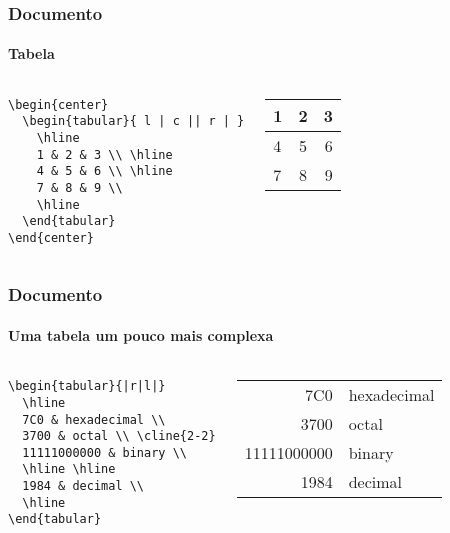 \begin{frame}[fragile]
\frametitle{Documento}
\framesubtitle{Tabela}
  \scriptsize
  \begin{columns}[c]
  \begin{verbatim}
\begin{center}
  \begin{tabular}{ l | c || r | }
    \hline
    1 & 2 & 3 \\ \hline
    4 & 5 & 6 \\ \hline
    7 & 8 & 9 \\
    \hline
  \end{tabular}
\end{center}
  \end{verbatim}
  \begin{fmpage}{\textwidth}
\begin{center}
  \begin{tabular}{ l | c || r | }
    \hline
    1 & 2 & 3 \\ \hline
    4 & 5 & 6 \\ \hline
    7 & 8 & 9 \\
    \hline
  \end{tabular}
\end{center}
  \end{fmpage}
  \end{columns}
\end{frame}


\begin{frame}[fragile]
\frametitle{Documento}
\framesubtitle{Uma tabela um pouco mais complexa}
  \scriptsize
  \begin{columns}[c]
  \begin{verbatim}
\begin{tabular}{|r|l|}
  \hline
  7C0 & hexadecimal \\
  3700 & octal \\ \cline{2-2}
  11111000000 & binary \\
  \hline \hline
  1984 & decimal \\
  \hline
\end{tabular}
  \end{verbatim}
  \begin{fmpage}{\textwidth}
\begin{tabular}{|r|l|}
  \hline
  7C0 & hexadecimal \\
  3700 & octal \\ \cline{2-2}
  11111000000 & binary \\
  \hline \hline
  1984 & decimal \\
  \hline
\end{tabular}
  \end{fmpage}
  \end{columns}
\end{frame}


